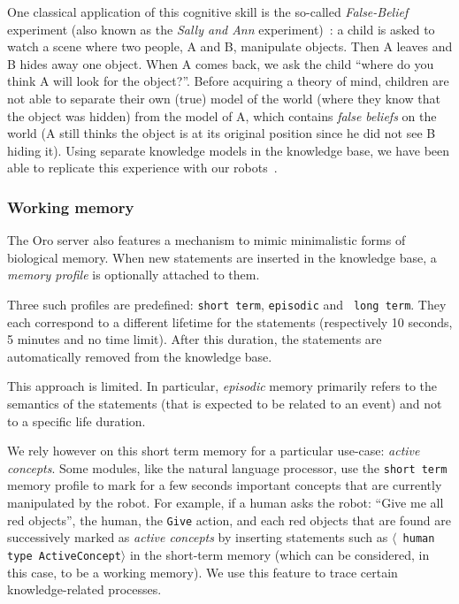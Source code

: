 \documentclass[preprint,12pt]{elsarticle}
\newcommand{\concept}[1]{{\small \texttt{#1}}}
\newcommand{\stmt}[1]{{\footnotesize \tt $\langle$ #1\relax$\rangle$}}
\begin{document}
One classical application of this cognitive skill is the so-called
\emph{False-Belief} experiment (also known as the \emph{Sally and Ann}
experiment)~\cite{Leslie2000}: a child is asked to watch a scene where two
people, A and B, manipulate objects. Then A leaves and B hides away one
object. When A comes back, we ask the child ``where do you think A will
look for the object?''. Before acquiring a theory of mind, children are not
able to separate their own (true) model of the world (where they know that
the object was hidden) from the model of A, which contains \emph{false
beliefs} on the world (A still thinks the object is at its original
position since he did not see B hiding it). Using separate knowledge models
in the knowledge base, we have been able to replicate this experience with
our robots~\cite{Warnier2012a}.

\subsubsection{Working memory}

The {\sc Oro} server also features a mechanism to mimic minimalistic forms of
biological memory.  When new statements are inserted in the knowledge base, a
\emph{memory profile} is optionally attached to them.

Three such profiles are predefined: {\tt short term}, {\tt episodic} and {\tt
long term}. They each correspond to a different lifetime for the statements
(respectively 10 seconds, 5 minutes and no time limit). After this duration,
the statements are automatically removed from the knowledge base.

This approach is limited. In particular, \emph{episodic} memory primarily
refers to the semantics of the statements (that is expected to be related to an
event) and not to a specific life duration.

We rely however on this short term memory for a particular use-case:
\emph{active concepts}. Some modules, like the natural language processor, use
the {\tt short term} memory profile to mark for a few seconds important
concepts that are currently manipulated by the robot. For example, if a human
asks the robot: ``Give me all red objects'', the human, the \concept{Give}
action, and each red objects that are found are successively marked as
\emph{active concepts} by inserting statements such as \stmt{human type
ActiveConcept} in the short-term memory (which can be considered, in this case,
to be a working memory). We use this feature to trace certain knowledge-related
processes.
\end{document}

